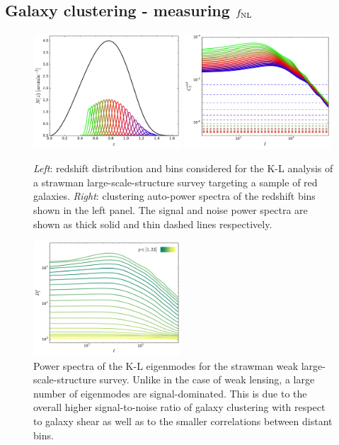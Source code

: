 \documentclass[twocolumn,amsfont,amssymb,amsmath, showpacs,balancelastpage, nofootinbib]{revtex4-1}
\begin{document}
  \subsection{Galaxy clustering - measuring $f_{\rm NL}$}\label{ssec:results.fnl}
    \begin{figure}
      \centering
      \includegraphics[width=0.49\textwidth]{Figs/nz_lsst_gc}
      \includegraphics[width=0.49\textwidth]{Figs/c_ij_gc}
      \caption{{\sl Left}: redshift distribution and bins considered for the K-L analysis of a strawman large-scale-structure survey targeting a sample of red galaxies. {\sl Right}: clustering auto-power spectra of the redshift bins shown in the left panel. The signal and noise power spectra are shown as thick solid and thin dashed lines respectively.}\label{fig:nz_gc}
    \end{figure}
    \begin{figure}
      \centering
      \includegraphics[width=0.49\textwidth]{Figs/d_p_gc}
      \caption{Power spectra of the K-L eigenmodes for the strawman weak large-scale-structure survey. Unlike in the case of weak lensing, a large number of eigenmodes are signal-dominated. This is due to the overall higher signal-to-noise ratio of galaxy clustering with respect to galaxy shear as well as to the smaller correlations between distant bins.}\label{fig:dp_gc}
    \end{figure}
\end{document}
